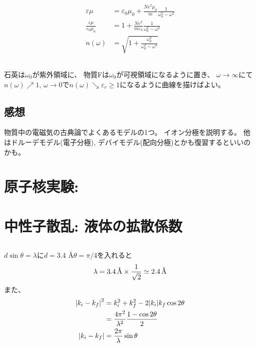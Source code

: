 \documentclass[../../master.tex]{subfiles}
\begin{document}
\subsection{}
\begin{align}
    \varepsilon\mu &= \varepsilon_0\mu_0+\frac{Ne^2\mu_0}{m}\frac{1}{\omega_0^2-\omega^2}\\
    \frac{\varepsilon\mu}{\varepsilon_0\mu_0} &= 1+\frac{Ne^2}{m\varepsilon_0}\frac{1}{\omega_0^2-\omega^2}\\
    n(\omega) &= \sqrt{1+\frac{\omega_p^2}{\omega_0^2-\omega^2}}
\end{align}

\subsection{}
石英は\(\omega_0\)が紫外領域に、
物質Fは\(\omega_0\)が可視領域になるように置き、
\(\omega\to\infty\)にて\(n(\omega)\nearrow 1\),
\(\omega\to 0\)で\(n(\omega)\searrow \varepsilon_r \ge 1\)になるように曲線を描けばよい。

\subsection*{感想}
物質中の電磁気の古典論でよくあるモデルの1つ。
イオン分極を説明する。
他はドルーデモデル(電子分極), デバイモデル(配向分極)とかも復習するといいのかも。

\clearpage
\section{原子核実験:}

\clearpage
\section{中性子散乱: 液体の拡散係数}
\subsection{}
\(d\sin\theta = \lambda\)に\(d=3.4\) \AA \(\theta = \pi/4\)を入れると
\begin{align}
    \lambda = 3.4 \text{\,\AA} \times \frac{1}{\sqrt{2}} \simeq 2.4 \text{\,\AA}
\end{align}
また、
\begin{align}
    \abs{k_i-k_f}^2 &= k_i^2+k_f^2-2\abs{k_i}{k_f}\cos2\theta\\
    &=\frac{4\pi^2}{\lambda^2}\frac{1-\cos2\theta}{2}\\
    \abs{k_i-k_f} &= \frac{2\pi}{\lambda}\sin\theta
\end{align}
\end{document}
